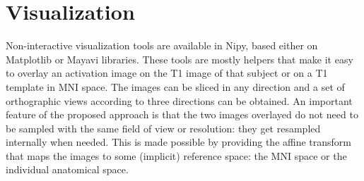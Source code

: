 \documentclass{bioinfo}
\begin{document}
\section{Visualization}
Non-interactive visualization tools are available in Nipy, based
either on Matplotlib or Mayavi libraries.
%
These tools are mostly helpers that make it easy to overlay an
activation image on the T1 image of that subject or on a T1 template
in MNI space.
%
The images can be sliced in any direction and a set of orthographic
views according to three directions can be obtained.
%
An important feature of the proposed approach is that the two images
overlayed do not need to be sampled with the same field of view or
resolution: they get resampled internally when needed. 
%
This is made possible by providing the affine transform that maps the
images to some (implicit) reference space: the MNI space or the
individual anatomical space.


\noindent
\hspace*{-.5cm}



\end{document}
